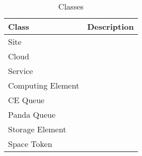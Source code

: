 \begin{table}[h!tpb]
\begin{center}
\begin{tabularx}{400pt}{|>{\hsize=0.3\hsize}X||>{\hsize=0.7\hsize}X|}
\hline
\textbf{Class} &\textbf{Description}\\\hline
Site & \\\hline
Cloud & \\\hline
Service & \\\hline
Computing Element &  \\\hline
CE Queue &  \\\hline
Panda Queue &  \\\hline
Storage Element  & \\\hline
Space Token  & \\\hline
\end{tabularx}
\end{center}
\caption{Classes}
\label{tab:RDFClassesProperties}
\end{table}

